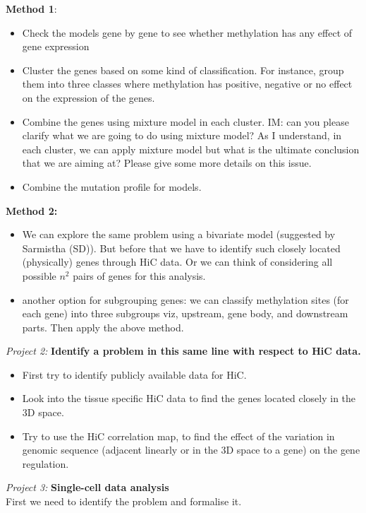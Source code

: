 \documentclass[11pt]{article}
\theoremstyle{remark}
\begin{document}
{\bf \large{Method 1}}: 
\begin{itemize}
\item Check the models gene by gene to see whether methylation has any effect of gene expression
\item Cluster the genes based on some kind of classification. For instance, group them into three classes where methylation has positive, negative or no effect on the expression of the genes.
\item Combine the genes using mixture model in each cluster. {\color{blue} IM: can you please clarify what we are going to do using mixture model? As I understand, in each cluster, we can apply mixture model but what is the ultimate conclusion that we are aiming at? Please give some more details on this issue.}
\item Combine the mutation profile for models.
\end{itemize}

{\bf \large{Method 2:}}
\begin{itemize}
\item We can explore the same problem using a bivariate model (suggested by Sarmistha (SD)). But before that we have to identify such closely located (physically) genes through HiC data. Or we can think of considering all possible $n^2$ pairs of genes for this analysis.
\item another option for subgrouping genes: we can classify methylation sites (for each gene) into three subgroups viz, upstream, gene body, and downstream parts. Then apply the above method.
\end{itemize}

\vspace{1cm}

\textit{Project 2:} {\bf Identify a problem in this same line with respect to HiC data.}

\begin{itemize}
\item First try to identify publicly available data for HiC.
\item Look into the tissue specific HiC data to find the genes located closely in the 3D space.
\item Try to use the HiC correlation map, to find the effect of the variation in genomic sequence (adjacent linearly or in the 3D space to a gene) on the gene regulation.
\end{itemize}

\vspace{1cm}

\textit{Project 3:} {\bf Single-cell data analysis} \\

First we need to identify the problem and formalise it.
\end{document}
